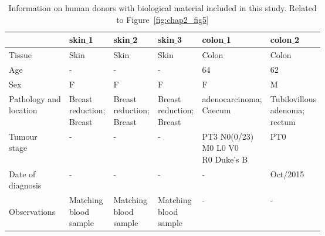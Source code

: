\begin{table}[htp!]
\footnotesize
\caption[Clinical information on human donors included in this study]{Information on human donors with biological material included in this study. Related to Figure~\ref{fig:chap2_fig5}}
\centering
\label{table:tab_A_2}
\begin{tabular}{l|l l l l l}
\hline 
  & skin${\_}$1 & skin${\_}$2 & skin${\_}$3 & colon${\_}$1 & colon${\_}$2\\
\hline
Tissue & Skin & Skin & Skin & Colon & Colon\\

Age & - & - & - & 64 & 62\\

Sex & F & F & F & F & M\\

\specialcell[t]{Pathology and\\location} & \specialcell[t]{Breast\\reduction;\\Breast} & \specialcell[t]{Breast\\reduction;\\Breast} & \specialcell[t]{Breast\\reduction;\\Breast} & \specialcell[t]{adenocarcinoma;\\Caecum} & \specialcell[t]{Tubilovillous\\adenoma;\\rectum}\\

\specialcell[t]{Tumour\\stage} & - & - & - & \specialcell[t]{PT3 N0(0/23)\\M0 L0 V0\\R0 Duke's B} & PT0\\

\specialcell[t]{Date of\\diagnosis} & - & - & - & - & Oct/2015\\

\specialcell[t]{ \\Observations\\ } & \specialcell[t]{Matching\\blood\\sample} & \specialcell[t]{Matching\\blood\\sample} & \specialcell[t]{Matching\\blood\\sample} & - & -\\
\hline 
\end{tabular}
\end{table}

